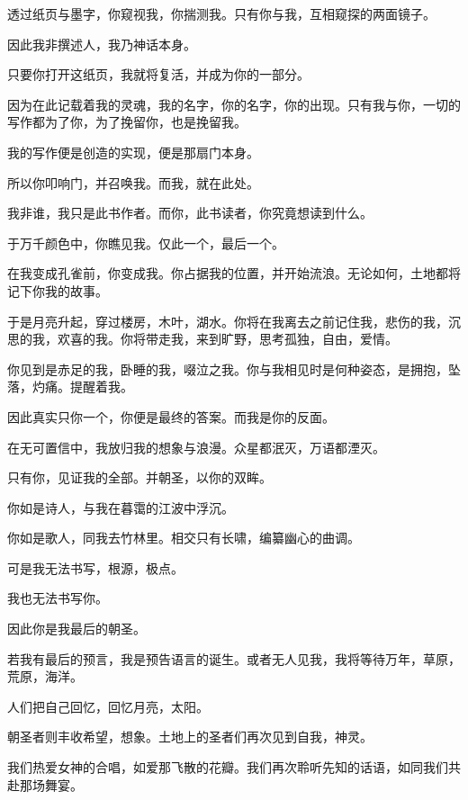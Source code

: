 \documentclass[UTF8]{article}
\begin{document}
\par 透过纸页与墨字，你窥视我，你揣测我。只有你与我，互相窥探的两面镜子。
\par 因此我非撰述人，我乃神话本身。
\par 只要你打开这纸页，我就将复活，并成为你的一部分。
\par 因为在此记载着我的灵魂，我的名字，你的名字，你的出现。只有我与你，一切的写作都为了你，为了挽留你，也是挽留我。
\par 我的写作便是创造的实现，便是那扇门本身。
\\[0.6cm]
\par 所以你叩响门，并召唤我。而我，就在此处。
\par 我非谁，我只是此书作者。而你，此书读者，你究竟想读到什么。
\\[0.6cm]
\par 于万千颜色中，你瞧见我。仅此一个，最后一个。
\par 在我变成孔雀前，你变成我。你占据我的位置，并开始流浪。无论如何，土地都将记下你我的故事。
\par 于是月亮升起，穿过楼房，木叶，湖水。你将在我离去之前记住我，悲伤的我，沉思的我，欢喜的我。你将带走我，来到旷野，思考孤独，自由，爱情。
\par 你见到是赤足的我，卧睡的我，啜泣之我。你与我相见时是何种姿态，是拥抱，坠落，灼痛。提醒着我。
\par 因此真实只你一个，你便是最终的答案。而我是你的反面。
\par 在无可置信中，我放归我的想象与浪漫。众星都泯灭，万语都湮灭。
\\[0.6cm]
\par 只有你，见证我的全部。并朝圣，以你的双眸。
\par 你如是诗人，与我在暮霭的江波中浮沉。
\par 你如是歌人，同我去竹林里。相交只有长啸，编纂幽心的曲调。
\\[0.6cm]
\par 可是我无法书写，根源，极点。
\par 我也无法书写你。
\par 因此你是我最后的朝圣。
\\[0.6cm]
\par 若我有最后的预言，我是预告语言的诞生。或者无人见我，我将等待万年，草原，荒原，海洋。
\par 人们把自己回忆，回忆月亮，太阳。
\par 朝圣者则丰收希望，想象。土地上的圣者们再次见到自我，神灵。
\par 我们热爱女神的合唱，如爱那飞散的花瓣。我们再次聆听先知的话语，如同我们共赴那场舞宴。
\end{document}
